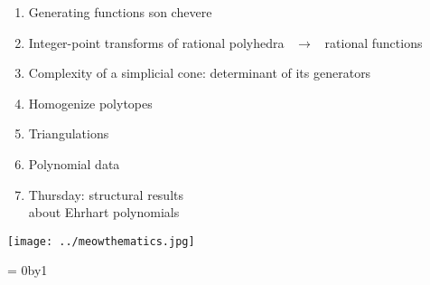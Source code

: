 \documentclass[landscape]{foils}
\def\mybullet{\green $\blacktriangleright$ \black}
\newcounter{frozenpage}
\def\thawpage{
  \count0=\thefrozenpage
  \advance\count0by1
  \renewcommand{\thepage}{\the\count0}
}
\def\green{\color{green}}
\def\blue{\color{blue}}
\def\black{\color{black}}
\def\bm{\blue $}
\def\em{$ \black }
\begin{document}
\vspace{-.2in}
\begin{enumerate}[\mybullet]
\item Generating functions son chevere
\item Integer-point transforms of rational polyhedra \ \bm \longrightarrow \em \
rational functions
\item Complexity of a simplicial cone: determinant of its generators
\item Homogenize polytopes
\item Triangulations
\item Polynomial data
\item Thursday: structural results \\ about Ehrhart polynomials
\end{enumerate}

\vspace{-3.3in}
\hspace{4.9in}
\texttt{[image: ../meowthematics.jpg]}

\vspace{-1.6in}
\hspace{8.7in}
\tiny
{}

\normalsize

\thawpage
\end{document}
